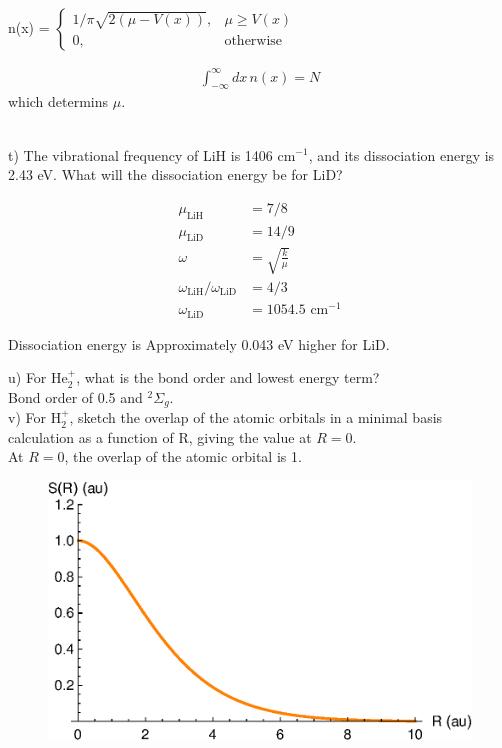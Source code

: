 \documentclass{article}
\begin{document}
{\color{blue}
  \begin{center}
  n(x) =
  $\begin{cases}
    1/\pi\sqrt{2(\mu - V(x))},&  \mu\geq V(x)\\
    0,              & \text{otherwise}
  \end{cases}$
  \end{center}

  \begin{align*}
    \int^{\infty}_{-\infty} dx \, n(x) = N
  \end{align*}
  which determins $\mu$.
}
\\

\noindent t) The vibrational frequency of LiH is 1406 cm$^{-1}$, and its dissociation
energy is 2.43 eV. What will the dissociation energy be for LiD?
\\

{\color{blue}
  \begin{align*}
    \mu_{\text{LiH}} & = 7/8 \\
    \mu_{\text{LiD}} & = 14/9 \\
    \omega & = \sqrt{\frac{k}{\mu}} \\
    \omega_{\text{LiH}}/\omega_{\text{LiD}} & = 4/3 \\
    \omega_{\text{LiD}} & = 1054.5 \text{ cm}^{-1}
  \end{align*}

  Dissociation energy is Approximately 0.043 eV higher for LiD.
}

\noindent u) For He$_2^+$, what is the bond order and lowest energy term?
\\

{\color{blue} Bond order of 0.5 and $^2\Sigma_g$.}
\\

\noindent v) For H$_2^+$, sketch the overlap of the atomic orbitals in a minimal basis
calculation as a function of R, giving the value at $R=0$.
\\

{\color{blue} At $R=0$, the overlap of the atomic orbital is 1.}
\begin{figure}[H]
  \centering
  \includegraphics[scale=0.75]{h2.eps}
  \label{fig:overlap}
\end{figure}
\end{document}
